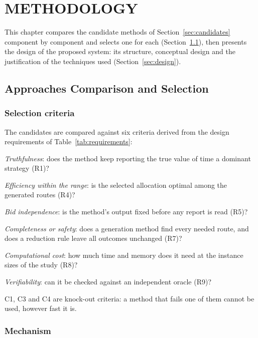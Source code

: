 \chapter{METHODOLOGY}
\label{ch:method}

This chapter compares the candidate methods of Section~\ref{sec:candidates}
component by component and selects one for each
(Section~\ref{sec:selection}), then presents the design of the proposed
system: its structure, conceptual design and the justification of the
techniques used (Section~\ref{sec:design}).

\section{Approaches Comparison and Selection}
\label{sec:selection}

\subsection{Selection criteria}

The candidates are compared against six criteria derived from the design
requirements of Table~\ref{tab:requirements}:
\begin{description}[leftmargin=1.2cm,style=nextline,itemsep=2pt]
\item[C1] \emph{Truthfulness}: does the method keep reporting the true value
of time a dominant strategy (R1)?
\item[C2] \emph{Efficiency within the range}: is the selected allocation
optimal among the generated routes (R4)?
\item[C3] \emph{Bid independence}: is the method's output fixed before any
report is read (R5)?
\item[C4] \emph{Completeness or safety}: does a generation method find every
needed route, and does a reduction rule leave all outcomes unchanged (R7)?
\item[C5] \emph{Computational cost}: how much time and memory does it need at
the instance sizes of the study (R8)?
\item[C6] \emph{Verifiability}: can it be checked against an independent
oracle (R9)?
\end{description}
C1, C3 and C4 are knock-out criteria: a method that fails one of them
cannot be used, however fast it is.

\subsection{Mechanism}

